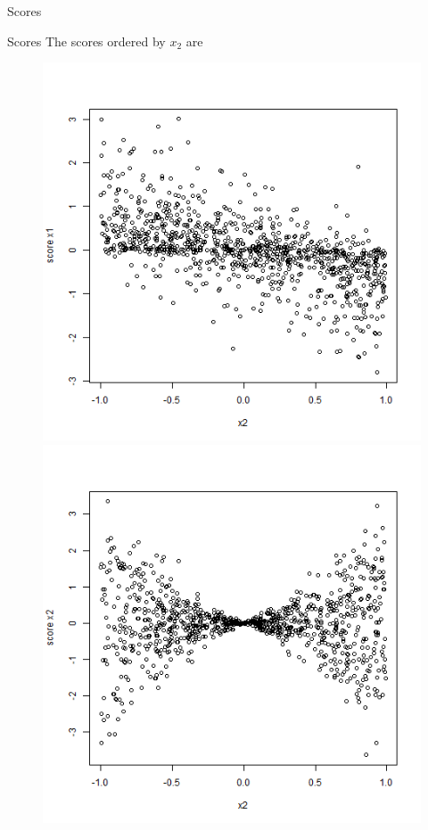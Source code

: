 \documentclass[9pt, xcolor=table]{beamer}
\begin{document}
\begin{frame}{Scores}
\end{frame}


\begin{frame}{Scores}
The scores ordered by $x_{2}$ are
\begin{figure}
    \centering
    \begin{minipage}{0.45\textwidth}
        \centering
        \includegraphics[width=1\textwidth]{Figures/Scores/misspecified_scores_x1_x2.png} 
    \end{minipage}\hfill
    \begin{minipage}{0.45\textwidth}
        \centering
        \includegraphics[width=1\textwidth]{Figures/Scores/misspecified_scores_x2_x2.png} 
    \end{minipage}
\end{figure}
    

\end{frame}
\end{document}
